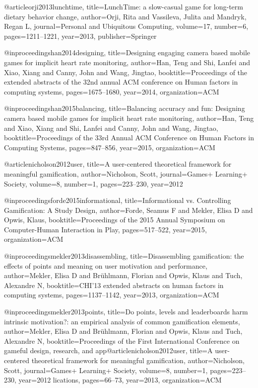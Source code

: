 @article{orji2013lunchtime,
  title={LunchTime: a slow-casual game for long-term dietary behavior change},
  author={Orji, Rita and Vassileva, Julita and Mandryk, Regan L},
  journal={Personal and Ubiquitous Computing},
  volume={17},
  number={6},
  pages={1211--1221},
  year={2013},
  publisher={Springer}
}

@inproceedings{han2014designing,
  title={Designing engaging camera based mobile games for implicit heart rate monitoring},
  author={Han, Teng and Shi, Lanfei and Xiao, Xiang and Canny, John and Wang, Jingtao},
  booktitle={Proceedings of the extended abstracts of the 32nd annual ACM conference on Human factors in computing systems},
  pages={1675--1680},
  year={2014},
  organization={ACM}
}

@inproceedings{han2015balancing,
  title={Balancing accuracy and fun: Designing camera based mobile games for implicit heart rate monitoring},
  author={Han, Teng and Xiao, Xiang and Shi, Lanfei and Canny, John and Wang, Jingtao},
  booktitle={Proceedings of the 33rd Annual ACM Conference on Human Factors in Computing Systems},
  pages={847--856},
  year={2015},
  organization={ACM}
}


@article{nicholson2012user,
  title={A user-centered theoretical framework for meaningful gamification},
  author={Nicholson, Scott},
  journal={Games+ Learning+ Society},
  volume={8},
  number={1},
  pages={223--230},
  year={2012}
}

@inproceedings{forde2015informational,
  title={Informational vs. Controlling Gamification: A Study Design},
  author={Forde, Seamus F and Mekler, Elisa D and Opwis, Klaus},
  booktitle={Proceedings of the 2015 Annual Symposium on Computer-Human Interaction in Play},
  pages={517--522},
  year={2015},
  organization={ACM}
}

@inproceedings{mekler2013disassembling,
  title={Disassembling gamification: the effects of points and meaning on user motivation and performance},
  author={Mekler, Elisa D and Br{\"u}hlmann, Florian and Opwis, Klaus and Tuch, Alexandre N},
  booktitle={CHI'13 extended abstracts on human factors in computing systems},
  pages={1137--1142},
  year={2013},
  organization={ACM}
}

@inproceedings{mekler2013points,
  title={Do points, levels and leaderboards harm intrinsic motivation?: an empirical analysis of common gamification elements},
  author={Mekler, Elisa D and Br{\"u}hlmann, Florian and Opwis, Klaus and Tuch, Alexandre N},
  booktitle={Proceedings of the First International Conference on gameful design, research, and app@article{nicholson2012user,
  title={A user-centered theoretical framework for meaningful gamification},
  author={Nicholson, Scott},
  journal={Games+ Learning+ Society},
  volume={8},
  number={1},
  pages={223--230},
  year={2012}
}
lications},
  pages={66--73},
  year={2013},
  organization={ACM}
}

